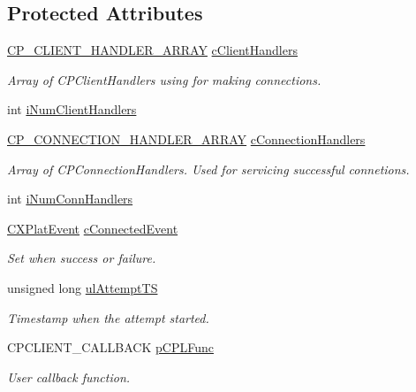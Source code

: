 \subsection*{\-Protected \-Attributes}
\begin{DoxyCompactItemize}
\item 
\hyperlink{_c_p_client_handler_8h_a9babc356867a188aa505ce2ce4a81c46}{\-C\-P\-\_\-\-C\-L\-I\-E\-N\-T\-\_\-\-H\-A\-N\-D\-L\-E\-R\-\_\-\-A\-R\-R\-A\-Y} \hyperlink{class_c_p_client_a475af425d617e19f2cd382cfcc6ac063}{c\-Client\-Handlers}
\begin{DoxyCompactList}\small\item\em \-Array of \-C\-P\-Client\-Handlers using for making connections. \end{DoxyCompactList}\item 
int \hyperlink{class_c_p_client_a7299daff3cd3437159533c9011ff96a0}{i\-Num\-Client\-Handlers}
\item 
\hyperlink{_c_p_connection_handler_8h_a05bf2fef946dbf14350a5f45bb28f953}{\-C\-P\-\_\-\-C\-O\-N\-N\-E\-C\-T\-I\-O\-N\-\_\-\-H\-A\-N\-D\-L\-E\-R\-\_\-\-A\-R\-R\-A\-Y} \hyperlink{class_c_p_client_a56e74ec04a07eeaa6761cffdc7ce7e88}{c\-Connection\-Handlers}
\begin{DoxyCompactList}\small\item\em \-Array of \-C\-P\-Connection\-Handlers. \-Used for servicing successful connetions. \end{DoxyCompactList}\item 
int \hyperlink{class_c_p_client_a5a9c9fb8e3e0c1faee5c9740fab8c8e7}{i\-Num\-Conn\-Handlers}
\item 
\hyperlink{class_c_x_plat_event}{\-C\-X\-Plat\-Event} \hyperlink{class_c_p_client_ad3f5a757a62ce581acb07cbb74deebe0}{c\-Connected\-Event}
\begin{DoxyCompactList}\small\item\em \-Set when success or failure. \end{DoxyCompactList}\item 
unsigned long \hyperlink{class_c_p_client_a84c9b4e693df05ea1e4e0621d97ba6e7}{ul\-Attempt\-T\-S}
\begin{DoxyCompactList}\small\item\em \-Timestamp when the attempt started. \end{DoxyCompactList}\item 
\-C\-P\-C\-L\-I\-E\-N\-T\-\_\-\-C\-A\-L\-L\-B\-A\-C\-K \hyperlink{class_c_p_client_a4ebdee1edb46b01abdc6a813d709b0b3}{p\-C\-P\-L\-Func}
\begin{DoxyCompactList}\small\item\em \-User callback function. \end{DoxyCompactList}\item 

\end{DoxyCompactItemize}
